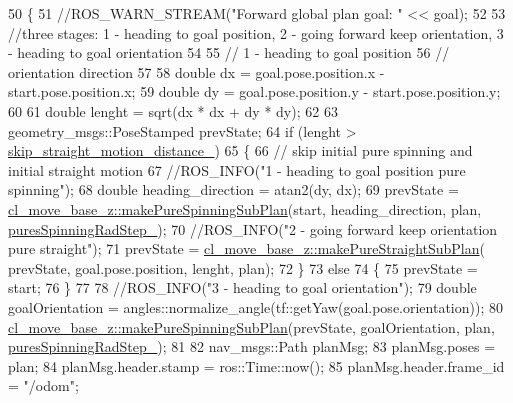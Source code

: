 \begin{DoxyCode}
50 \{
51     \textcolor{comment}{//ROS\_WARN\_STREAM("Forward global plan goal: " << goal);}
52 
53     \textcolor{comment}{//three stages: 1 - heading to goal position, 2 - going forward keep orientation, 3 - heading to goal
       orientation}
54 
55     \textcolor{comment}{// 1 - heading to goal position}
56     \textcolor{comment}{// orientation direction}
57 
58     \textcolor{keywordtype}{double} dx = goal.pose.position.x - start.pose.position.x;
59     \textcolor{keywordtype}{double} dy = goal.pose.position.y - start.pose.position.y;
60 
61     \textcolor{keywordtype}{double} lenght = sqrt(dx * dx + dy * dy);
62 
63     geometry\_msgs::PoseStamped prevState;
64     \textcolor{keywordflow}{if} (lenght > \hyperlink{classcl__move__base__z_1_1forward__global__planner_1_1ForwardGlobalPlanner_abafd101fa62caf2d74f118a0b4bb948c}{skip\_straight\_motion\_distance\_})
65     \{
66         \textcolor{comment}{// skip initial pure spinning and initial straight motion}
67         \textcolor{comment}{//ROS\_INFO("1 - heading to goal position pure spinning");}
68         \textcolor{keywordtype}{double} heading\_direction = atan2(dy, dx);
69         prevState = \hyperlink{namespacecl__move__base__z_ac774e138510eb7b5e0015be1f7709e19}{cl\_move\_base\_z::makePureSpinningSubPlan}(start, 
      heading\_direction, plan, \hyperlink{classcl__move__base__z_1_1forward__global__planner_1_1ForwardGlobalPlanner_a6aed6f8f6e57a8c5821977814d0b9402}{puresSpinningRadStep\_});
70         \textcolor{comment}{//ROS\_INFO("2 - going forward keep orientation pure straight");}
71         prevState = \hyperlink{namespacecl__move__base__z_a1d6998cc28a1847906272f2bf92bacc8}{cl\_move\_base\_z::makePureStraightSubPlan}(
      prevState, goal.pose.position, lenght, plan);
72     \}
73     \textcolor{keywordflow}{else}
74     \{
75         prevState = start;
76     \}
77 
78     \textcolor{comment}{//ROS\_INFO("3 - heading to goal orientation");}
79     \textcolor{keywordtype}{double} goalOrientation = angles::normalize\_angle(tf::getYaw(goal.pose.orientation));
80     \hyperlink{namespacecl__move__base__z_ac774e138510eb7b5e0015be1f7709e19}{cl\_move\_base\_z::makePureSpinningSubPlan}(prevState, 
      goalOrientation, plan, \hyperlink{classcl__move__base__z_1_1forward__global__planner_1_1ForwardGlobalPlanner_a6aed6f8f6e57a8c5821977814d0b9402}{puresSpinningRadStep\_});
81 
82     nav\_msgs::Path planMsg;
83     planMsg.poses = plan;
84     planMsg.header.stamp = ros::Time::now();
85     planMsg.header.frame\_id = \textcolor{stringliteral}{"/odom"};

\end{DoxyCode}
